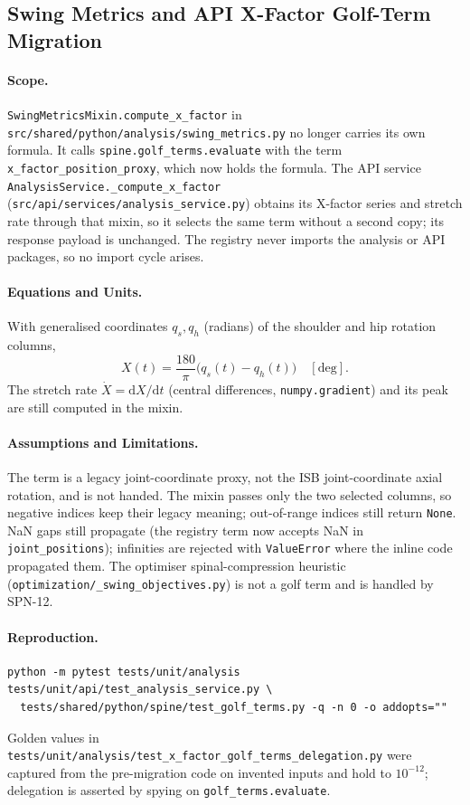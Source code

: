 \subsection{Swing Metrics and API X-Factor Golf-Term Migration}

\paragraph{Scope.}
\texttt{SwingMetricsMixin.compute\_x\_factor} in
\texttt{src/shared/python/analysis/swing\_metrics.py} no longer carries its own
formula. It calls \texttt{spine.golf\_terms.evaluate} with the term
\texttt{x\_factor\_position\_proxy}, which now holds the formula. The API
service \texttt{AnalysisService.\_compute\_x\_factor}
(\texttt{src/api/services/analysis\_service.py}) obtains its X-factor series and
stretch rate through that mixin, so it selects the same term without a second
copy; its response payload is unchanged. The registry never imports the
analysis or API packages, so no import cycle arises.

\paragraph{Equations and Units.}
With generalised coordinates $q_s,q_h$ (radians) of the shoulder and hip
rotation columns,
\begin{equation}
  X(t) = \frac{180}{\pi}\bigl(q_s(t)-q_h(t)\bigr)\quad[\mathrm{deg}].
\end{equation}
The stretch rate $\dot X=\mathrm{d}X/\mathrm{d}t$ (central differences,
\texttt{numpy.gradient}) and its peak are still computed in the mixin.

\paragraph{Assumptions and Limitations.}
The term is a legacy joint-coordinate proxy, not the ISB joint-coordinate axial
rotation, and is not handed. The mixin passes only the two selected columns, so
negative indices keep their legacy meaning; out-of-range indices still return
\texttt{None}. NaN gaps still propagate (the registry term now accepts NaN in
\texttt{joint\_positions}); infinities are rejected with \texttt{ValueError}
where the inline code propagated them. The optimiser spinal-compression
heuristic (\texttt{optimization/\_swing\_objectives.py}) is not a golf term and
is handled by SPN-12.

\paragraph{Reproduction.}
\begin{verbatim}
python -m pytest tests/unit/analysis tests/unit/api/test_analysis_service.py \
  tests/shared/python/spine/test_golf_terms.py -q -n 0 -o addopts=""
\end{verbatim}
Golden values in
\texttt{tests/unit/analysis/test\_x\_factor\_golf\_terms\_delegation.py} were
captured from the pre-migration code on invented inputs and hold to
$10^{-12}$; delegation is asserted by spying on \texttt{golf\_terms.evaluate}.
